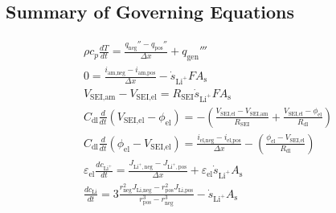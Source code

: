\documentclass[12pt]{article}
\begin{document}
	\subsection{Summary of Governing Equations}
		\begin{gather}
			\rho c_p \frac{dT}{dt} = \frac{q_\text{neg}'' - q_\text{pos}''}{\Delta x} + q_\text{gen}'''\\
			0 = \frac{i_\text{am,neg} - i_\text{am,pos}}{\Delta x} - \dot{s}_{\text{Li}^+}F A_\text{s}\\
			V_\text{SEI,am} - V_\text{SEI,el} = R_\text{SEI} \dot{s}_{\text{Li}^+}F A_\text{s}\\
			C_\text{dl}\frac{d }{dt}(V_\text{SEI,el} - \phi_\text{el}) = -\left(\frac{V_\text{SEI,el} - V_\text{SEI,am}}{R_\text{SEI}} + \frac{V_\text{SEI,el} - \phi_\text{el}}{R_\text{dl}} \right)\\
			C_\text{dl}\frac{d }{dt}(\phi_\text{el} - V_\text{SEI,el}) = \frac{i_\text{el,neg} - i_\text{el,pos}}{\Delta x} -\left(\frac{\phi_\text{el} - V_\text{SEI,el}}{R_\text{dl}} \right)\\
			\varepsilon_{\text{el}}  \frac{dc_{\text{Li}^+}}{dt} = \frac{ J_{\text{Li}^+,\text{neg}} - J_{\text{Li}^+,\text{pos}} }{\Delta x} + \varepsilon_{\text{el}} \dot{s}_{\text{Li}^+}A_\text{s}\\
			\frac{dc_{\text{Li}}}{dt}  = 3\frac{ r_\text{neg}^2  J_{\text{Li,neg}}   - r_\text{pos}^2 J_{\text{Li,pos}}   }{r_\text{pos}^3 - r_\text{neg}^3} -  \dot{s}_{\text{Li}^+}A_\text{s}
		\end{gather}
\end{document}
